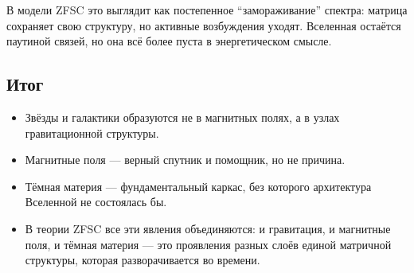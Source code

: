 \documentclass[a4paper,12pt]{article}
\begin{document}
В модели ZFSC это выглядит как постепенное ``замораживание'' спектра: матрица сохраняет свою структуру, но активные возбуждения уходят. Вселенная остаётся паутиной связей, но она всё более пуста в энергетическом смысле.

\subsection*{Итог}
\begin{itemize}
  \item Звёзды и галактики образуются не в магнитных полях, а в узлах гравитационной структуры.
  \item Магнитные поля --- верный спутник и помощник, но не причина.
  \item Тёмная материя --- фундаментальный каркас, без которого архитектура Вселенной не состоялась бы.
  \item В теории ZFSC все эти явления объединяются: и гравитация, и магнитные поля, и тёмная материя --- это проявления разных слоёв единой матричной структуры, которая разворачивается во времени.
\end{itemize}
\end{document}
